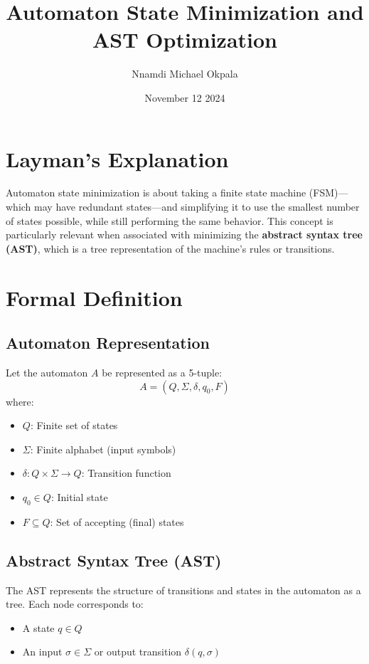 \documentclass{article}
\title{Automaton State Minimization and AST Optimization}
\author{Nnamdi Michael Okpala}
\date{November 12 2024}
\begin{document}
\maketitle

\section{Layman's Explanation}
Automaton state minimization is about taking a finite state machine (FSM)---which may have redundant states---and simplifying it to use the smallest number of states possible, while still performing the same behavior. This concept is particularly relevant when associated with minimizing the \textbf{abstract syntax tree (AST)}, which is a tree representation of the machine's rules or transitions.

\section{Formal Definition}

\subsection{Automaton Representation}
Let the automaton $A$ be represented as a 5-tuple:
\[
A = (Q, \Sigma, \delta, q_0, F)
\]
where:
\begin{itemize}
    \item $Q$: Finite set of states
    \item $\Sigma$: Finite alphabet (input symbols)
    \item $\delta: Q \times \Sigma \to Q$: Transition function
    \item $q_0 \in Q$: Initial state
    \item $F \subseteq Q$: Set of accepting (final) states
\end{itemize}

\subsection{Abstract Syntax Tree (AST)}
The AST represents the structure of transitions and states in the automaton as a tree. Each node corresponds to:
\begin{itemize}
    \item A state $q \in Q$
    \item An input $\sigma \in \Sigma$ or output transition $\delta(q, \sigma)$
\end{itemize}
\end{document}
